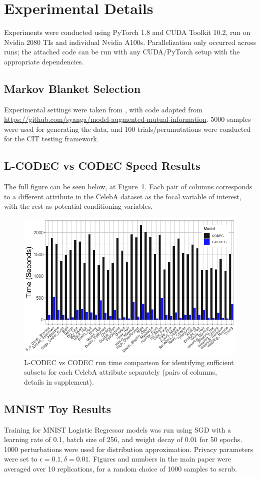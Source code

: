\section{Experimental Details}
Experiments were conducted using PyTorch 1.8 and CUDA Toolkit 10.2, run on Nvidia 2080 TIs and individual Nvidia A100s. Parallelization only occurred across runs; the attached code can be run with any CUDA/PyTorch setup with the appropriate dependencies.

\subsection{Markov Blanket Selection}
Experimental settings were taken from \cite{bullseye}, with code adapted from  \url{https://github.com/syanga/model-augmented-mutual-information}. 5000 samples were used for generating the data, and 100 trials/perumutations were conducted for the CIT testing framework. 

\subsection{L-CODEC vs CODEC Speed Results}
The full figure can be seen below, at Figure~\ref{fig:full_speed_hist}. Each pair of columns corresponds to a different attribute in the CelebA dataset as the focal variable of interest, with the rest as potential conditioning variables.
\begin{figure}[h]
    \centering
    \includegraphics[width=0.7\columnwidth]{5_unlearn/figs/Speed_Hist.png}
    \caption{\label{fig:full_speed_hist} L-CODEC vs CODEC run time comparison for identifying sufficient subsets for each CelebA attribute separately (pairs of columns, details in supplement).}
\end{figure}

\subsection{MNIST Toy Results}
Training for MNIST Logistic Regressor models was run using SGD with a learning rate of 0.1, batch size of 256, and weight decay of $0.01$ for 50 epochs. 1000 perturbations were used for distribution approximation. Privacy parameters were set to $\epsilon=0.1, \delta=0.01$.
Figures and numbers in the main paper were averaged over 10 replications, for a random choice of 1000 samples to scrub.

